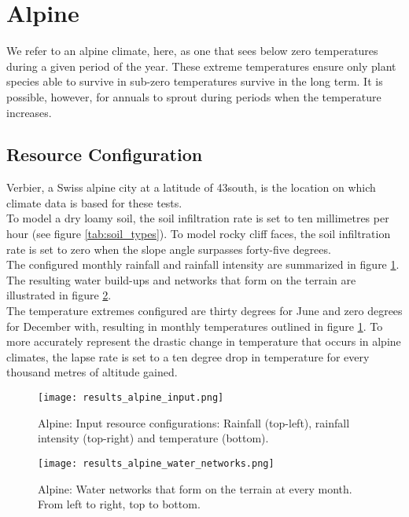 \section{Alpine}

We refer to an alpine climate, here, as one that sees below zero temperatures during a given period of the year. These extreme temperatures ensure only plant species able to survive in sub-zero temperatures survive in the long term. It is possible, however, for annuals to sprout during periods when the temperature increases.\\

\subsection{Resource Configuration}

Verbier, a Swiss alpine city at a latitude of 43\textdegree south, is the location on which climate data is
based for these tests.\\

To model a dry loamy soil, the soil infiltration rate is set to ten millimetres per hour (see figure \ref{tab:soil_types}). To
model rocky cliff faces, the soil infiltration rate is set to zero when the slope angle surpasses forty-five degrees.\\

The configured monthly rainfall and rainfall intensity are summarized in figure \ref{fig:results_alpine_input}. The resulting water build-ups and networks that form on the terrain are illustrated in figure \ref{fig:results_alpine_water_networks}.\\

The temperature extremes configured are thirty degrees for June and zero degrees for December with, resulting in monthly temperatures outlined in figure \ref{fig:results_alpine_input}. To more accurately represent the drastic change in temperature that occurs in alpine climates, the lapse rate is set to a ten degree drop in temperature for every thousand metres of altitude gained.\\

\begin{figure}
\center
	\texttt{[image: results\_alpine\_input.png]}
	\caption{ Alpine: Input resource configurations: Rainfall (top-left), rainfall intensity (top-right) and temperature (bottom).}
	\label{fig:results_alpine_input}
\end{figure}

\begin{figure}
\center
	\texttt{[image: results\_alpine\_water\_networks.png]}
	\caption{ Alpine: Water networks that form on the terrain at every month. From left to right, top to bottom.}
	\label{fig:results_alpine_water_networks}
\end{figure}

